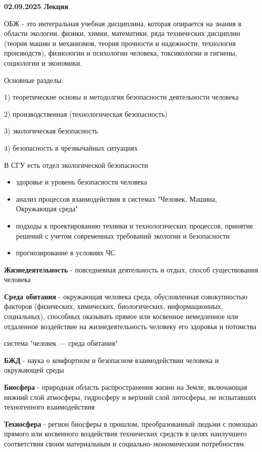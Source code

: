 \documentclass{article}
\begin{document}
 


 \textbf{02.09.2025 Лекция}
 
 ОБЖ - это интегральная учебная дисциплина, которая опирается на знания в
 области экологии, физики, химии, математики, ряда технических дисциплин (теория
 машин и механизмов, теория прочности и надежности, технология производств),
 физиологии и психологии человека, токсикологии и гигиены, социологии и
 экономики.

 Основные разделы:

 1) теоретические основы и методолгия безопасности деятельности человека

 2) производственная (технологическая безопасность)

 3) экологическая безопасность
 
 4) безопасность в чрезвычайных ситуациях


 В СГУ есть отдел экологической безопасности

 \begin{itemize}
    \item здоровье и уровень безопасности человека
    \item анализ процессов взаимодействия в системах "Человек, Машина, Окружающая среда"
    \item подходы к проектированию техники и технологических процессов, принятие решений с учетом современных требований экологии и безопасности
    \item прогнозирование в условиях ЧС

\end{itemize}

\textbf{Жизнедеятельность} - повседневная деятельность и отдых, способ существования человека

\textbf{Среда обитания} - окружающая человека среда, обусловленная совокупностью факторов (физических, химических, биологических, информационных, социальных), способных оказывать прямое или косвенное немедленное или отдаленное воздействие на жизнедеятельность человеку его здоровья и потомства

система "человек --- среда обитания"

\textbf{БЖД} - наука о комфортном и безопасном взаимодействии человека и окружающей среды

\textbf{Биосфера} - природная область распространения жизни на Земле, включающая
нижний слой атмосферы, гидросферу и верхний слой литосферы, не испытавших
техногенного взаимодействия

\textbf{Техносфера} - регион биосферы в прошлом, преобразованный людьми с
помощью прямого или косвенного воздействия технических средств в целях
наилучшего соответствия своим материальным и социально-экономическим
потребностям. 
\end{document}

